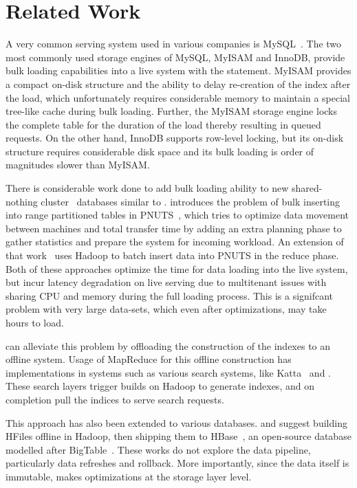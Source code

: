\section{Related Work}
\label{sec:related_work}

A very common serving system used in various companies is
MySQL~\cite{mysql}. The two most commonly used storage engines of
MySQL, MyISAM and InnoDB, provide bulk loading capabilities into a
live system with the  statement. MyISAM provides
a compact on-disk structure and the ability to delay re-creation of
the index after the load, which unfortunately requires considerable
memory to maintain a special tree-like cache during bulk loading.
Further, the MyISAM storage engine locks the complete table for the
duration of the load thereby resulting in queued requests. On the
other hand, InnoDB supports row-level locking, but its on-disk
structure requires considerable disk space and its bulk loading is
order of magnitudes slower than MyISAM. 

There is considerable work done to add bulk loading ability to new
shared-nothing cluster~\cite{sharednothing} databases similar to
\projectname{}. \citet{silberstein} introduces the problem of bulk
inserting into range partitioned tables in PNUTS~\cite{pnuts}, which
tries to optimize data movement between machines and total transfer
time by adding an extra planning phase to gather statistics and
prepare the system for incoming workload. An extension of that
work~\citet{pnutsbatch} uses Hadoop to batch insert data into PNUTS in
the reduce phase. Both of these approaches optimize the time for data
loading into the live system, but incur latency degradation on live
serving due to multitenant issues with sharing CPU and memory during
the full loading process. This is a signifcant problem with very large
data-sets, which even after optimizations, may take hours to load.  

\projectname{} can alleviate this problem by offloading the
construction of the indexes to an offline system. Usage of MapReduce
for this offline construction has implementations in systems such as
various search systems, like Katta~\cite{katta} and \citet{mika}.
These search layers trigger builds on Hadoop to generate indexes, and
on completion pull the indices to serve search requests. 

This approach has also been extended to various databases.
\citet{konstantinou} and \citet{barbuzzi} suggest building HFiles
offline in Hadoop, then shipping them to HBase~\cite{hbase}, an
open-source database modelled after BigTable~\cite{bigtable}. These
works do not explore the data pipeline, particularly data refreshes
and rollback. More importantly, since the data itself is immutable,
\projectname{} makes optimizations at the storage layer level.

